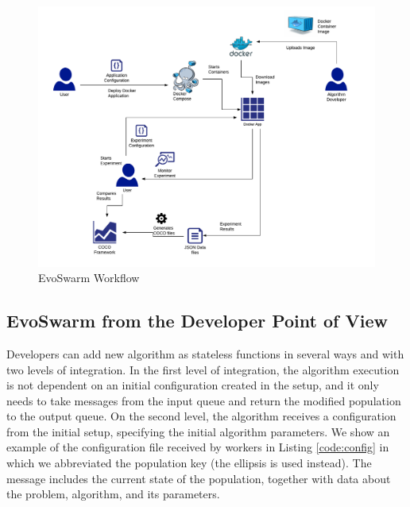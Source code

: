 \documentclass[review]{elsarticle}
\begin{document}
\begin{figure}
    \centering
    \includegraphics[width=\textwidth]{experiment_flow}
    \caption{EvoSwarm Workflow}
    \label{fig:experiment_flow}
\end{figure}

\subsection{EvoSwarm from the Developer Point of View} 

Developers can add new algorithm as stateless functions in
several ways and with two levels of integration. In the first level of
integration, the algorithm execution is not dependent on an initial
configuration created in the setup, and it only needs to take messages from the
input queue and return the modified population to the output queue. On the
second level, the algorithm receives a configuration from the initial setup,
specifying the initial algorithm parameters. We show an example of the configuration
file received by workers in Listing \ref{code:config}  in which we abbreviated
the population key (the ellipsis is used instead). The message includes the current state
of the population, together with data about the problem, algorithm,
and its parameters. 
\end{document}
